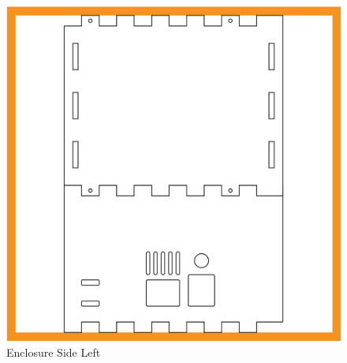 \begin{figure}[h]
	\centering
	\includegraphics[width=1\textwidth]{packaging-design/side2.png}
	\caption{Enclosure Side Left}
	\label{fig:side2}
\end{figure}